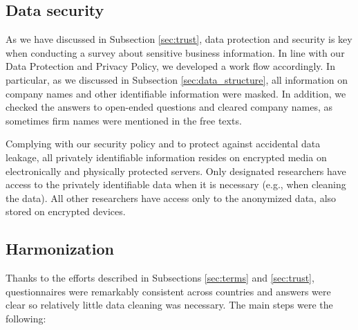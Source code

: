\documentclass[final, dvipsnames, authoryear,12pt]{elsarticle}
\begin{document}
\subsection{Data security} 

As we have discussed in Subsection \ref{sec:trust}, data protection and security is key when conducting a survey about sensitive business information. In line with our Data Protection and Privacy Policy, we developed a work flow accordingly. In particular, as we discussed in Subsection \ref{sec:data_structure}, all information on company names and other identifiable information were masked. In addition, we checked the answers to open-ended questions and cleared company names, as sometimes firm names were mentioned in the free texts.

Complying with our security policy and to protect against accidental data leakage, all privately identifiable information resides on encrypted media on electronically and physically protected servers. Only designated researchers have access to the privately identifiable data when it is necessary (e.g., when cleaning the data). All other researchers have access only to the anonymized data, also stored on encrypted devices.


\subsection{Harmonization} 

Thanks to the efforts described in Subsections \ref{sec:terms} and \ref{sec:trust}, questionnaires were remarkably consistent across countries and answers were clear so relatively little data cleaning was necessary. The main steps were the following:
\end{document}
